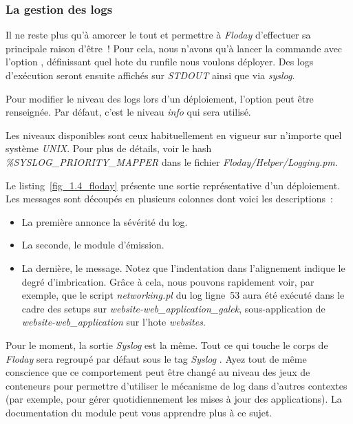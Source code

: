 \subsubsection{La gestion des logs}

Il ne reste plus qu'à amorcer le tout et permettre à \emph{Floday} d'effectuer sa principale raison d'être~!
Pour cela, nous n'avons qu'à lancer la commande  avec l'option , définissant quel \gls{hote} du runfile nous voulons déployer.
Des logs d'exécution seront ensuite affichés sur \emph{STDOUT} ainsi que via \emph{syslog}.

Pour modifier le niveau des logs lors d'un déploiement, l'option  peut être renseignée.
Par défaut, c'est le niveau \emph{info} qui sera utilisé.

Les niveaux disponibles sont ceux habituellement en vigueur sur n'importe quel système \emph{UNIX}.
Pour plus de détails, voir le hash \emph{\%SYSLOG\_PRIORITY\_MAPPER} dans le fichier \emph{Floday/Helper/Logging.pm}.



Le listing~\ref{fig_1.4_floday} présente une sortie représentative d'un déploiement.
Les messages sont découpés en plusieurs colonnes dont voici les descriptions~:
\begin{itemize}
	\item La première annonce la sévérité du log.
	\item La seconde, le module d'émission.
	\item La dernière, le message. Notez que l'indentation dans l'alignement indique le degré d'imbrication. Grâce à cela, nous pouvons rapidement voir, par exemple, que le script \emph{networking.pl} du log ligne~53 aura été exécuté dans le cadre des setups sur \emph{website-web\_application\_galek}, sous-application de \emph{website-web\_application} sur l'\gls{hote} \emph{websites}.
\end{itemize}

Pour le moment, la sortie \emph{Syslog} est la même.
Tout ce qui touche le corps de \emph{Floday} sera regroupé par défaut sous le tag \emph{Syslog} .
Ayez tout de même conscience que ce comportement peut être changé au niveau des jeux de conteneurs pour permettre d'utiliser le mécanisme de log dans d'autres contextes (par exemple, pour gérer quotidiennement les mises à jour des applications).
La documentation du module  peut vous apprendre plus à ce sujet.

